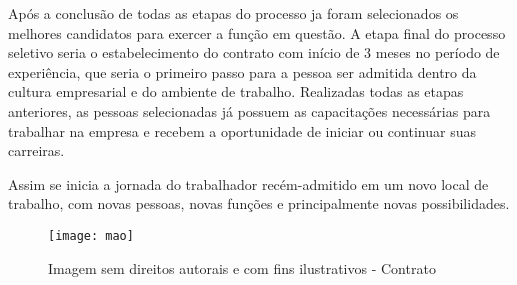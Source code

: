 \documentclass[12pt]{article}
\begin{document}
Após a conclusão de todas as etapas do processo ja foram selecionados os melhores candidatos para exercer a função em questão. A etapa final do processo seletivo seria o estabelecimento do contrato com início de 3 meses no período de experiência, que seria o primeiro passo para a pessoa ser admitida dentro da cultura empresarial e do ambiente de trabalho. Realizadas todas as etapas anteriores, as pessoas selecionadas já possuem as capacitações necessárias para trabalhar na empresa e recebem a oportunidade de iniciar ou continuar suas carreiras.

Assim se inicia a jornada do trabalhador recém-admitido em um novo local de trabalho, com novas pessoas, novas funções e principalmente novas possibilidades.

\begin{figure}[h]
	\centering
	\texttt{[image: mao]}
	\caption{Imagem sem direitos autorais e com fins ilustrativos - Contrato}
	\label{fig:mesh1}
\end{figure}
\end{document}
